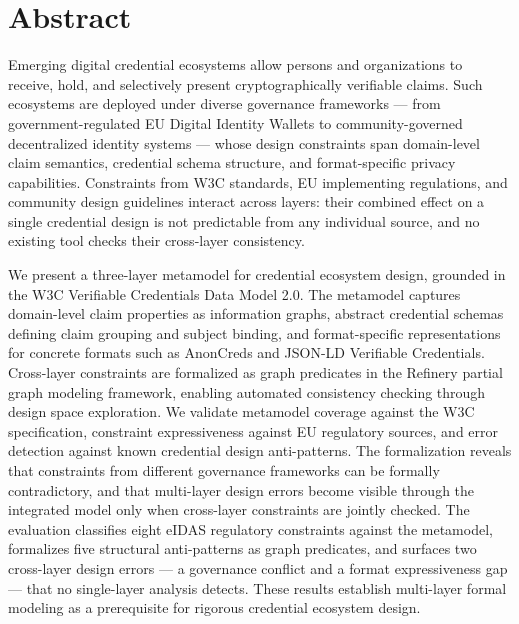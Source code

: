 \section{Abstract}\label{abstract}

Emerging digital credential ecosystems allow persons and organizations to receive, hold, and selectively present cryptographically verifiable claims. Such ecosystems are deployed under diverse governance frameworks --- from government-regulated EU Digital Identity Wallets to community-governed decentralized identity systems --- whose design constraints span domain-level claim semantics, credential schema structure, and format-specific privacy capabilities. Constraints from W3C standards, EU implementing regulations, and community design guidelines interact across layers: their combined effect on a single credential design is not predictable from any individual source, and no existing tool checks their cross-layer consistency.

We present a three-layer metamodel for credential ecosystem design, grounded in the W3C Verifiable Credentials Data Model 2.0. The metamodel captures domain-level claim properties as information graphs, abstract credential schemas defining claim grouping and subject binding, and format-specific representations for concrete formats such as AnonCreds and JSON-LD Verifiable Credentials. Cross-layer constraints are formalized as graph predicates in the Refinery partial graph modeling framework, enabling automated consistency checking through design space exploration. We validate metamodel coverage against the W3C specification, constraint expressiveness against EU regulatory sources, and error detection against known credential design anti-patterns. The formalization reveals that constraints from different governance frameworks can be formally contradictory, and that multi-layer design errors become visible through the integrated model only when cross-layer constraints are jointly checked. The evaluation classifies eight eIDAS regulatory constraints against the metamodel, formalizes five structural anti-patterns as graph predicates, and surfaces two cross-layer design errors --- a governance conflict and a format expressiveness gap --- that no single-layer analysis detects. These results establish multi-layer formal modeling as a prerequisite for rigorous credential ecosystem design.



